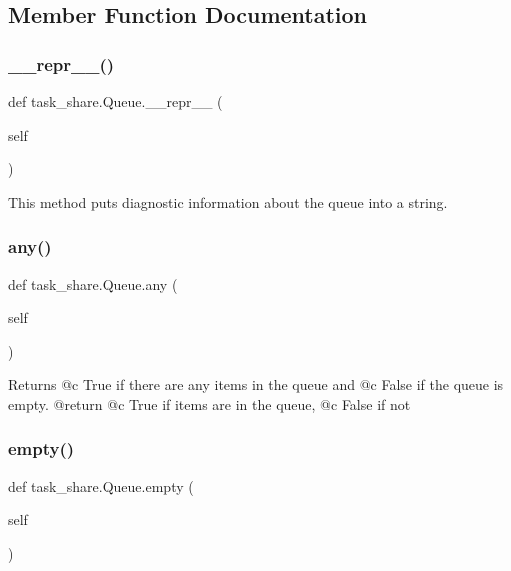 \subsection{Member Function Documentation}
\mbox{\label{classtask__share_1_1_queue_a94d0801557844c8f7dcb772ca768a1a4}} 
\subsubsection{\texorpdfstring{\_\_repr\_\_()}{\_\_repr\_\_()}}
{\footnotesize\ttfamily def task\+\_\+share.\+Queue.\+\_\+\+\_\+repr\+\_\+\+\_\+ (\begin{DoxyParamCaption}\item[{}]{self }\end{DoxyParamCaption})}

\begin{DoxyVerb}This method puts diagnostic information about the queue into a 
string. \end{DoxyVerb}
 \mbox{\label{classtask__share_1_1_queue_a7cb2d23978b90a232cf9cea4cc0ccb6b}} 
\subsubsection{\texorpdfstring{any()}{any()}}
{\footnotesize\ttfamily def task\+\_\+share.\+Queue.\+any (\begin{DoxyParamCaption}\item[{}]{self }\end{DoxyParamCaption})}

\begin{DoxyVerb}Returns @c True if there are any items in the queue and @c False
if the queue is empty.
@return @c True if items are in the queue, @c False if not \end{DoxyVerb}
 \mbox{\label{classtask__share_1_1_queue_af9ada059fc09a44adc9084901e2f7266}} 
\subsubsection{\texorpdfstring{empty()}{empty()}}
{\footnotesize\ttfamily def task\+\_\+share.\+Queue.\+empty (\begin{DoxyParamCaption}\item[{}]{self }\end{DoxyParamCaption})}

